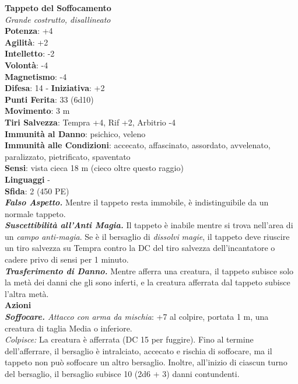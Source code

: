 \begin{multicols}{2}
\medskip\textbf{Tappeto del Soffocamento}\\
\emph{Grande costrutto, disallineato}\\
\textbf{Potenza}: +4\\
\textbf{Agilità}: +2\\
\textbf{Intelletto}: -2\\
\textbf{Volontà}: -4\\
\textbf{Magnetismo}: -4\\
\textbf{Difesa}: 14 - \textbf{Iniziativa}: +2\\
\textbf{Punti Ferita}: 33 (6d10)\\
\textbf{Movimento}: 3 m\\
\textbf{Tiri Salvezza}: Tempra +4, Rif +2, Arbitrio -4\\
\textbf{Immunità al Danno}: psichico, veleno\\
\textbf{Immunità alle Condizioni}: accecato, affascinato, assordato, avvelenato, paralizzato, pietrificato, spaventato\\
\textbf{Sensi}: vista cieca 18 m (cieco oltre questo raggio)\\
\textbf{Linguaggi} -\\
\textbf{Sfida}: 2 (450 PE)\smallskip\\
\emph{\textbf{Falso Aspetto.}} Mentre il tappeto resta immobile, è indistinguibile da un normale tappeto.\\

\emph{\textbf{Suscettibilità all'Anti Magia.}} Il tappeto è inabile mentre si trova nell'area di un \emph{campo anti-magia}. Se è il bersaglio di \emph{dissolvi} \emph{magie}, il tappeto deve riuscire un tiro salvezza su Tempra contro la DC del tiro salvezza dell'incantatore o cadere privo di sensi per 1 minuto.\\

\emph{\textbf{Trasferimento di Danno.}} Mentre afferra una creatura, il tappeto subisce solo la metà dei danni che gli sono inferti, e la creatura afferrata dal tappeto subisce l'altra metà.\\

\smallskip\textbf{Azioni}\\

\emph{\textbf{Soffocare.} Attacco con arma da mischia}: +7 al colpire, portata 1 m, una creatura di taglia Media o inferiore.\\

\emph{Colpisce:} La creatura è afferrata (DC  15 per fuggire). Fino al termine dell'afferrare, il bersaglio è intralciato, accecato e rischia di soffocare, ma il tappeto non può soffocare un altro bersaglio. Inoltre, all'inizio di ciascun turno del bersaglio, il bersaglio subisce 10 (2d6 + 3) danni contundenti. 


\end{multicols}
